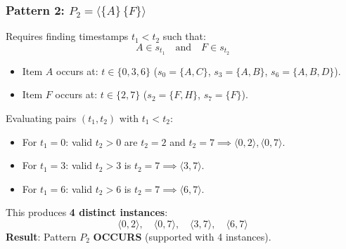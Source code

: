 \subsubsection{Pattern 2: $P_2 = \langle \{A\} \, \{F\} \rangle$}
Requires finding timestamps $t_1 < t_2$ such that:
\begin{equation*}
A \in s_{t_1} \quad \text{and} \quad F \in s_{t_2}
\end{equation*}
\begin{itemize}
    \item Item $A$ occurs at: $t \in \{0, 3, 6\}$ ($s_0 = \{A, C\}$, $s_3 = \{A, B\}$, $s_6 = \{A, B, D\}$).
    \item Item $F$ occurs at: $t \in \{2, 7\}$ ($s_2 = \{F, H\}$, $s_7 = \{F\}$).
\end{itemize}
Evaluating pairs $(t_1, t_2)$ with $t_1 < t_2$:
\begin{itemize}
    \item For $t_1 = 0$: valid $t_2 > 0$ are $t_2 = 2$ and $t_2 = 7 \implies \langle 0, 2 \rangle, \langle 0, 7 \rangle$.
    \item For $t_1 = 3$: valid $t_2 > 3$ is $t_2 = 7 \implies \langle 3, 7 \rangle$.
    \item For $t_1 = 6$: valid $t_2 > 6$ is $t_2 = 7 \implies \langle 6, 7 \rangle$.
\end{itemize}
This produces \textbf{4 distinct instances}:
\begin{equation}
\langle 0, 2 \rangle, \quad \langle 0, 7 \rangle, \quad \langle 3, 7 \rangle, \quad \langle 6, 7 \rangle
\end{equation}
\textbf{Result}: Pattern $P_2$ \textbf{OCCURS} (supported with 4 instances).

